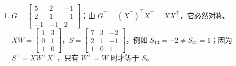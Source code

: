\begin{enumerate}[label={},leftmargin=4.8em,itemsep=4pt]
\item[\textbf{\hyperref[exercise:gram-asymmetry]{C-033.}}] \leavevmode{}\label{solution:C-033}\label{solution:gram-asymmetry}$G=\begin{bmatrix}5&2&-1\\2&1&-1\\-1&-1&2\end{bmatrix}$；由 $G^\top=(X^\top)^\top X^\top=XX^\top$，它必然对称。$XW=\begin{bmatrix}1&3\\0&1\\1&0\end{bmatrix}$，$S=\begin{bmatrix}7&3&-2\\2&1&-1\\1&0&1\end{bmatrix}$，例如 $S_{13}=-2\neq S_{31}=1$；因为 $S^\top=XW^\top X^\top$，只有 $W^\top=W$ 时才等于 $S$。
\end{enumerate}
